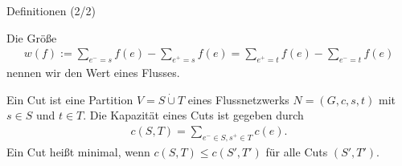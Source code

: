 \documentclass[aspectratio=169]{beamer}
\begin{document}
\begin{frame}{Definitionen (2/2)}
  \begin{definition*}
    Die Größe
    \begin{align*}
      w(f) := \sum_{e^- = s}f(e) - \sum_{e^+ = s} f(e) = \sum_{e^+ = t}f(e) - \sum_{e^- = t} f(e)
    \end{align*}
    nennen wir den Wert eines Flusses.
  \end{definition*}

  \pause

  \begin{definition*}[Cut]
    Ein Cut ist eine Partition $V = S \dot \cup T$ eines Flussnetzwerks $N = (G,c,s,t)$
    mit $s \in S$ und $t \in T$. Die Kapazität eines Cuts ist gegeben durch
    \begin{align*}
      c(S,T) = \sum_{e^- \in S, s^+ \in T} c(e).
    \end{align*}
    Ein Cut heißt minimal, wenn $c(S,T) \leq c(S',T')$ für alle Cuts $(S',T')$.
  \end{definition*}

  \end{frame}
\end{document}
